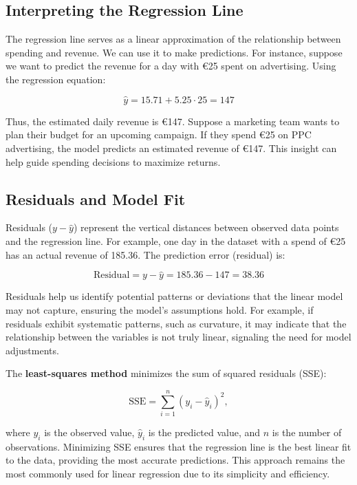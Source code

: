 \documentclass[
]{book}
\theoremstyle{definition}
\theoremstyle{definition}
\theoremstyle{definition}
\theoremstyle{definition}
\theoremstyle{remark}
\begin{document}
\subsection*{Interpreting the Regression Line}\label{interpreting-the-regression-line}

The regression line serves as a linear approximation of the relationship between spending and revenue. We can use it to make predictions. For instance, suppose we want to predict the revenue for a day with €25 spent on advertising. Using the regression equation:

\[
\hat{y} = 15.71 + 5.25 \cdot 25 = 147
\]

Thus, the estimated daily revenue is €147. Suppose a marketing team wants to plan their budget for an upcoming campaign. If they spend €25 on PPC advertising, the model predicts an estimated revenue of €147. This insight can help guide spending decisions to maximize returns.

\subsection*{Residuals and Model Fit}\label{residuals-and-model-fit}

Residuals (\(y - \hat{y}\)) represent the vertical distances between observed data points and the regression line. For example, one day in the dataset with a spend of €25 has an actual revenue of 185.36. The prediction error (residual) is:

\[
\text{Residual} = y - \hat{y} = 185.36 - 147 = 38.36
\]

Residuals help us identify potential patterns or deviations that the linear model may not capture, ensuring the model's assumptions hold. For example, if residuals exhibit systematic patterns, such as curvature, it may indicate that the relationship between the variables is not truly linear, signaling the need for model adjustments.

The \textbf{least-squares method} minimizes the sum of squared residuals (SSE):

\begin{equation} 
\text{SSE} = \sum_{i=1}^{n} (y_i - \hat{y}_i)^2,
\label{eq:sse}
\end{equation}

where \(y_i\) is the observed value, \(\hat{y}_i\) is the predicted value, and \(n\) is the number of observations. Minimizing SSE ensures that the regression line is the best linear fit to the data, providing the most accurate predictions. This approach remains the most commonly used for linear regression due to its simplicity and efficiency.
\end{document}
